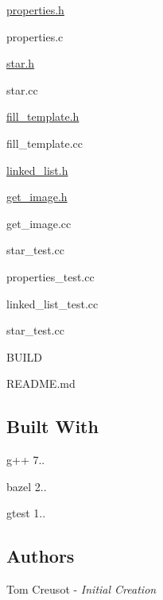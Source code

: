 \begin{DoxyItemize}
\item \hyperlink{properties_8h_source}{properties.\+h}
\item properties.\+c
\item \hyperlink{star_8h}{star.\+h}
\item star.\+cc
\item \hyperlink{fill__template_8h}{fill\+\_\+template.\+h}
\item fill\+\_\+template.\+cc
\item \hyperlink{linked__list_8h_source}{linked\+\_\+list.\+h}
\item \hyperlink{get__image_8h_source}{get\+\_\+image.\+h}
\item get\+\_\+image.\+cc ~\newline
~\newline

\item star\+\_\+test.\+cc
\item properties\+\_\+test.\+cc
\item linked\+\_\+list\+\_\+test.\+cc
\item star\+\_\+test.\+cc ~\newline
~\newline

\item B\+U\+I\+LD
\item R\+E\+A\+D\+M\+E.\+md
\end{DoxyItemize}

\subsection*{Built With}


\begin{DoxyItemize}
\item g++ 7..
\item bazel 2..
\item gtest 1..
\end{DoxyItemize}

\subsection*{Authors}


\begin{DoxyItemize}
\item Tom Creusot -\/ {\itshape Initial Creation} 
\end{DoxyItemize}